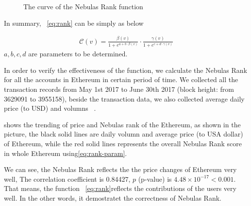 \begin{figure}
\centering
{}
\caption{The curve of the Nebulas Rank function \label{fig-nr}}
\end{figure}


\vspace{2em}
In summary, ~\ref{eq:rank} can be simply as below

\begin{align}
\label{eq:rank-param}
\mathcal{C}(v) =  \frac{\beta(v)}{1+e^{a + b \cdot \beta(v)}} \cdot \frac{\gamma(v)}{1+e^{c + d \cdot \gamma(v)}}
\end{align}
\noindent $a, b, c, d$ are parameters to be determined.


In order to verify the effectiveness of the function, we calculate the Nebulas Rank for all the accounts in Ethereum in certain period of time. We collected all the transaction records from May 1st 2017 to June 30th 2017 (block height: from 3629091 to 3955158), beside the transaction data, we also collected average daily price (to USD) and volumns ~\cite{coinmarketcap}.

 shows the trending of price and Nebulas rank of the Ethereum, as shown in the picture, the black solid lines are daily volumn and average price (to USA dollar) of Ethereum, while the red solid lines represents the overall Nebulas Rank score in whole Ethereum using\ref{eq:rank-param}.

We can see, the Nebulas Rank reflects the the price changes of Ethereum very well, The correlation coefficient is 0.84427, $p$ (p-value) is $4.48\times{}10^{-17}<0.001$. That means, the function ~\ref{eq:rank}reflects the contributions of the users very well. In the other words, it demostratet the correctness of Nebulas Rank. 


